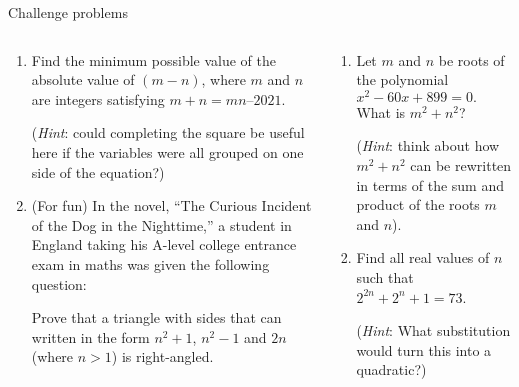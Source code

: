 \documentclass[9pt,aspectratio=169,handout]{beamer}
\begin{document}
\begin{frame}{Challenge problems}
  \begin{columns}[T]
    \begin{column}{0.5\textwidth}
      \begin{enumerate}
        \item Find the minimum possible value of the absolute value of $(m - n)$, where $m$ and $n$ are integers satisfying $m + n = mn – 2021$. 
        
        (\emph{Hint}: could completing the square be useful here if the variables were all grouped on one side of the equation?)
        \item (For fun) In the novel, “The Curious Incident of the Dog in the Nighttime,” a student in England taking his A-level college entrance exam in maths was given the following question: 
        
        Prove that a triangle with sides that can written in the form $n^2 +1$, $n^2 -1$ and $2n$ (where $n > 1$) is right-angled.  
        \seti
      \end{enumerate}
    \end{column}
    \begin{column}{0.5\textwidth}
      \begin{enumerate}
        \conti
        \item Let $m$ and $n$ be roots of the polynomial $x^2 − 60x + 899 = 0.$  What is $m^2 + n^2$? 
        
        (\emph{Hint}: think about how $m^2 + n^2$ can be rewritten in terms of the sum and product of the roots $m$ and $n$).
        \item Find all real values of $n$ such that $2^{2n} + 2^n + 1 = 73$.  
        
        (\emph{Hint}:  What substitution would turn this into a quadratic?)
      \end{enumerate}
    \end{column}
  \end{columns}
\end{frame}
\end{document}
